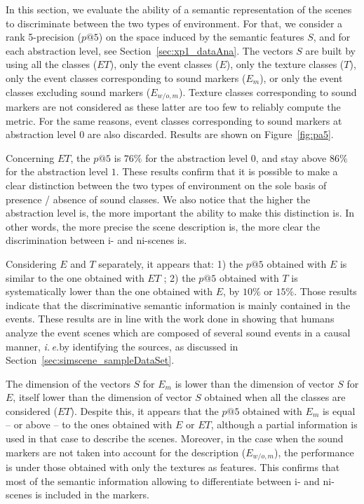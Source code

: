 \documentclass[preprint,12pt]{elsarticle}
\newcommand{\ie}{\emph{i.\,e.}}
\begin{document}
In this section, we evaluate the ability of a semantic representation of the scenes to discriminate between the two types of environment. For that, we consider a rank 5-precision ($p@5$) on the space induced by the semantic features $S$, and for each abstraction level, see Section~\ref{sec:xp1_dataAna}. The vectors $S$ are built by using all the classes ($ET$), only the event classes ($E$), only the texture classes ($T$), only the event classes corresponding to sound markers ($E_m$), or only the event classes excluding sound markers ($E_{w/o,m}$). Texture classes corresponding to sound markers are not considered as these latter are too few to reliably compute the metric. For the same reasons, event classes corresponding to sound markers at abstraction level $0$ are also discarded. Results are shown on Figure~\ref{fig:pa5}.

Concerning $ET$, the $p@5$ is $76\%$ for the abstraction level $0$, and stay above $86\%$ for the abstraction level $1$. These results confirm that it is possible to make a clear distinction between the two types of environment on the sole basis of presence / absence of sound classes. We also notice that the higher the abstraction level is, the more important the ability to make this distinction is. In other words, the more precise the scene description is, the more clear the discrimination between i- and ni-scenes is.

Considering $E$ and $T$ separately, it appears that: 1) the $p@5$ obtained with $E$ is similar to the one obtained with $ET$ ; 2) the $p@5$ obtained with $T$ is systematically lower than the one obtained with $E$, by $10\%$ or $15\%$. Those results indicate that the discriminative semantic information is mainly contained in the events. These results are in line with the work done in \cite{maffiolo_caracterisation_1999} showing that humans analyze the event scenes which are composed of several sound events in a causal manner, \ie by identifying the sources, as discussed in Section~\ref{sec:simscene_sampleDataSet}.

The dimension of the vectors $S$ for $E_m$ is lower than the dimension of vector $S$ for $E$, itself lower than the dimension of vector $S$ obtained when all the classes are considered ($ET$). Despite this, it appears that the $p@5$ obtained with $E_m$ is equal – or above – to the ones obtained with $E$ or $ET$, although a partial information is used in that case to describe the scenes. Moreover, in the case when the sound markers are not taken into account for the description ($E_{w/o,m}$), the performance is under those obtained with only the textures as features. This confirms that most of the semantic information allowing to differentiate between i- and ni-scenes is included in the markers.
\end{document}
